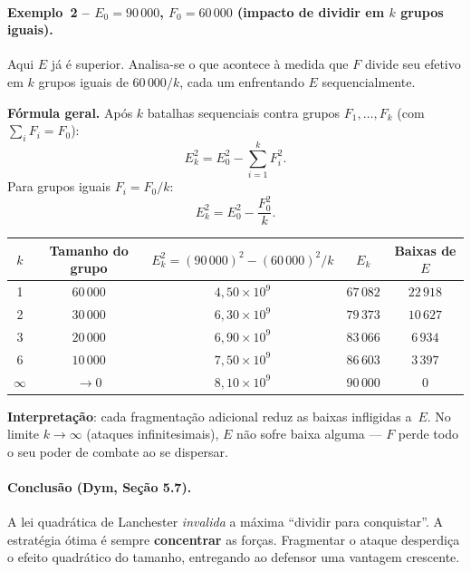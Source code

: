 \documentclass[12pt,a4paper]{article}
\theoremstyle{definition}
\begin{document}
\paragraph{Exemplo~2 -- $E_0 = 90\,000$,\; $F_0 = 60\,000$
  (impacto de dividir em $k$ grupos iguais).}

Aqui $E$ j\'a \'e superior.
Analisa-se o que acontece \`a medida que $F$ divide seu efetivo em
$k$ grupos iguais de $60\,000/k$, cada um enfrentando $E$ sequencialmente.

\noindent\textbf{F\'ormula geral.}
Ap\'os $k$ batalhas sequenciais contra grupos $F_1, \ldots, F_k$
(com $\textstyle\sum_i F_i = F_0$):
\begin{equation}
  E_k^2 = E_0^2 - \sum_{i=1}^{k} F_i^2.
  \label{eq:geral_k}
\end{equation}
Para grupos iguais $F_i = F_0/k$:
\begin{equation}
  E_k^2 = E_0^2 - \frac{F_0^2}{k}.
\end{equation}

\begin{center}
\begin{tabular}{ccccc}
\toprule
$k$ & Tamanho do grupo & $E_k^2 = (90\,000)^2 - (60\,000)^2/k$
    & $E_k$ & Baixas de $E$ \\
\midrule
1        & $60\,000$ & $4{,}50\times10^{9}$ & $67\,082$ & $22\,918$ \\
2        & $30\,000$ & $6{,}30\times10^{9}$ & $79\,373$ & $10\,627$ \\
3        & $20\,000$ & $6{,}90\times10^{9}$ & $83\,066$ & $6\,934$  \\
6        & $10\,000$ & $7{,}50\times10^{9}$ & $86\,603$ & $3\,397$  \\
$\infty$ & $\to 0$   & $8{,}10\times10^{9}$ & $90\,000$ & $0$       \\
\bottomrule
\end{tabular}
\end{center}

\textbf{Interpreta\c{c}\~ao}: cada fragmenta\c{c}\~ao adicional reduz as baixas
infligidas a~$E$.
No limite $k \to \infty$ (ataques infinitesimais), $E$ n\~ao sofre baixa alguma
--- $F$ perde todo o seu poder de combate ao se dispersar.

\paragraph{Conclus\~ao (Dym, Se\c{c}\~ao 5.7).}
A lei quadr\'atica de Lanchester \emph{invalida} a m\'axima ``dividir para conquistar''.
A estrat\'egia \'otima \'e sempre \textbf{concentrar} as for\c{c}as.
Fragmentar o ataque desperdi\c{c}a o efeito quadr\'atico do tamanho, entregando ao
defensor uma vantagem crescente.
\end{document}
